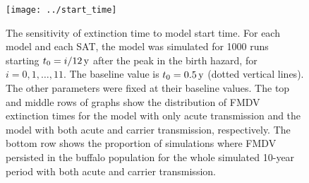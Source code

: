 \documentclass[12pt, USenglish]{article}  %
\begin{document}
\begin{figure}
  \centering
  \texttt{[image: ../start\_time]}
  \caption{The sensitivity of extinction time to model start time.
    For each model and each SAT, the model was simulated for
    1000 runs starting $t_0 = \unit[i / 12]{y}$ after the peak in the
    birth hazard, for $i = 0, 1, \dots, 11$. The baseline value is
    $t_0 = \unit[0.5]{y}$ (dotted vertical lines). The other
    parameters were fixed at their baseline values. The top and middle
    rows of graphs show the distribution of FMDV extinction times for
    the model with only acute transmission and the model with both
    acute and carrier transmission, respectively. The bottom row shows
    the proportion of simulations where FMDV persisted in the buffalo
    population for the whole simulated 10-year period with both acute
    and carrier transmission.}
  \label{fig:start_time}
\end{figure}
\end{document}
